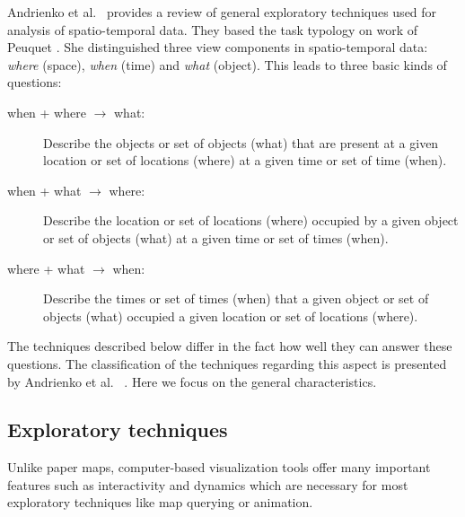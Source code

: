 \documentclass[a4paper,12pt,oneside]{book}
\begin{document}
Andrienko et al.\ \cite{andrienko2003exploratory} provides a review
of general exploratory techniques used for analysis of spatio-temporal data.
They based the task typology on work
of Peuquet \cite{peuquet1994s}.
She distinguished three view components in spatio-temporal data:
\emph{where} (space), \emph{when} (time) and \emph{what} (object).
This leads to three basic kinds of questions:
\begin{description}
    \item[when + where $\rightarrow$ what:]
        Describe the objects or set of objects (what) that are present
        at a given location or set of locations (where)
        at a given time or set of time (when).

    \item [when + what $\rightarrow$ where:]
        Describe the location or set of locations (where) occupied
        by a given object or set of objects (what) at
        a given time or set of times (when).

    \item [where + what $\rightarrow$ when:]
        Describe the times or set of times (when) that a given
        object or set of objects (what) occupied a
        given location or set of locations (where).
 \end{description}

The techniques described below differ in the fact how well they can answer these questions.
The classification of the techniques regarding this aspect is presented by Andrienko et al.%
\ \cite{andrienko2003exploratory}.
Here we focus on the general characteristics.
% 
%  

\subsection{Exploratory techniques}
\label{sec:exploratoryTechniques}
Unlike paper maps, computer-based visualization tools offer many important features
such as interactivity and dynamics which are necessary for most exploratory techniques
like map querying or animation.
\end{document}
